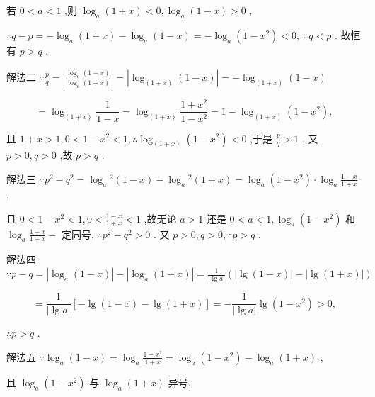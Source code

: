 \documentclass[10pt]{article}
\begin{document}
若 \(0 < a < 1\) ,则 \({\log }_{a}\left( {1 + x}\right)  < 0,{\log }_{a}\left( {1 - x}\right)  > 0\) ,

\(\therefore q - p =  - {\log }_{a}\left( {1 + x}\right)  - {\log }_{a}\left( {1 - x}\right)  =  - {\log }_{a}\left( {1 - {x}^{2}}\right)  < 0,\;\therefore q < p\) . 故恒有 \(p > q\) .

解法二 \(\because \frac{p}{q} = \left| \frac{{\log }_{a}\left( {1 - x}\right) }{{\log }_{a}\left( {1 + x}\right) }\right|  = \left| {{\log }_{\left( 1 + x\right) }\left( {1 - x}\right) }\right|  =  - {\log }_{\left( 1 + x\right) }\left( {1 - x}\right)\)

\[
= {\log }_{\left( 1 + x\right) }\frac{1}{1 - x} = {\log }_{\left( 1 + x\right) }\frac{1 + {x}^{2}}{1 - {x}^{2}} = 1 - {\log }_{\left( 1 + x\right) }\left( {1 - {x}^{2}}\right) ,
\]

且 \(1 + x > 1,0 < 1 - {x}^{2} < 1,\therefore {\log }_{\left( 1 + x\right) }\left( {1 - {x}^{2}}\right)  < 0\) ,于是 \(\frac{p}{q} > 1\) . 又 \(p > 0,q > 0\) ,故 \(p > q\) .

解法三 \(\because {p}^{2} - {q}^{2} = {\log }_{a}{}^{2}\left( {1 - x}\right)  - {\log }_{a}{}^{2}\left( {1 + x}\right)  = {\log }_{a}\left( {1 - {x}^{2}}\right)  \cdot  {\log }_{a}\frac{1 - x}{1 + x}\) ,

且 \(0 < 1 - {x}^{2} < 1,0 < \frac{1 - x}{1 + x} < 1\) ,故无论 \(a > 1\) 还是 \(0 < a < 1,{\log }_{a}\left( {1 - {x}^{2}}\right)\) 和 \({\log }_{a}\frac{1 - x}{1 + x} -\) 定同号, \(\therefore {p}^{2} - {q}^{2} > 0\) . 又 \(p > 0,q > 0,\therefore p > q\) .

解法四 \(\because p - q = \left| {{\log }_{a}\left( {1 - x}\right) }\right|  - \left| {{\log }_{a}\left( {1 + x}\right) }\right|  = \frac{1}{\left| \lg a\right| }\left( {\left| {\lg \left( {1 - x}\right) }\right|  - \left| {\lg \left( {1 + x}\right) }\right| }\right)\)

\[
= \frac{1}{\left| \lg a\right| }\left\lbrack  {-\lg \left( {1 - x}\right)  - \lg \left( {1 + x}\right) }\right\rbrack   =  - \frac{1}{\left| \lg a\right| }\lg \left( {1 - {x}^{2}}\right)  > 0,
\]

\(\therefore p > q\) .

解法五 \(\because {\log }_{a}\left( {1 - x}\right)  = {\log }_{a}\frac{1 - {x}^{2}}{1 + x} = {\log }_{a}\left( {1 - {x}^{2}}\right)  - {\log }_{a}\left( {1 + x}\right)\) ,

且 \({\log }_{a}\left( {1 - {x}^{2}}\right)\) 与 \({\log }_{a}\left( {1 + x}\right)\) 异号,
\end{document}

